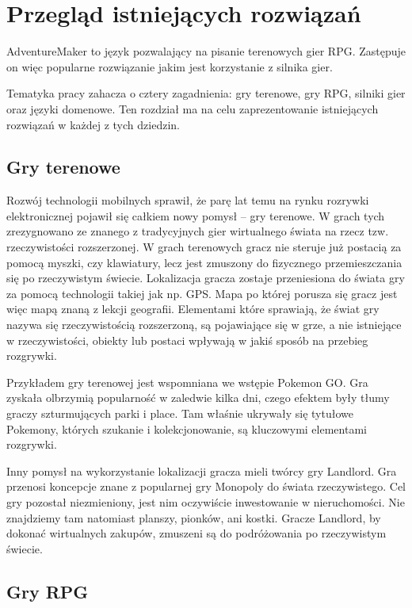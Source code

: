 \documentclass[openright]{xmgr}
\begin{document}
\chapter{Przegląd istniejących rozwiązań}

AdventureMaker to język pozwalający na pisanie terenowych gier RPG. Zastępuje on więc popularne rozwiązanie jakim jest korzystanie z silnika gier.

Tematyka pracy zahacza o cztery zagadnienia: gry terenowe, gry RPG, silniki gier oraz języki domenowe. Ten rozdział ma na celu zaprezentowanie istniejących rozwiązań w każdej z tych dziedzin.

\section{Gry terenowe}

Rozwój technologii mobilnych sprawił, że parę lat temu na rynku rozrywki elektronicznej pojawił się całkiem nowy pomysł -- gry terenowe. W grach tych zrezygnowano ze znanego z tradycyjnych gier wirtualnego świata na rzecz tzw. rzeczywistości rozszerzonej. W grach terenowych gracz nie steruje już postacią za pomocą myszki, czy klawiatury, lecz jest zmuszony do fizycznego przemieszczania się po rzeczywistym świecie. Lokalizacja gracza zostaje przeniesiona do świata gry za pomocą technologii takiej jak np. GPS. Mapa po której porusza się gracz jest więc mapą znaną z lekcji geografii. Elementami które sprawiają, że świat gry nazywa się rzeczywistością rozszerzoną, są pojawiające się w grze, a nie istniejące w rzeczywistości, obiekty lub postaci wpływają w jakiś sposób na przebieg rozgrywki.

Przykładem gry terenowej jest wspomniana we wstępie Pokemon GO. Gra zyskała olbrzymią popularność w zaledwie kilka dni, czego efektem były tłumy graczy szturmujących parki i place. Tam właśnie ukrywały się tytułowe Pokemony, których szukanie i kolekcjonowanie, są kluczowymi elementami rozgrywki.

Inny pomysł na wykorzystanie lokalizacji gracza mieli twórcy gry Landlord. Gra przenosi koncepcje znane z popularnej gry Monopoly do świata rzeczywistego. Cel gry pozostał niezmieniony, jest nim oczywiście inwestowanie w nieruchomości. Nie znajdziemy tam natomiast planszy, pionków, ani kostki. Gracze Landlord, by dokonać wirtualnych zakupów, zmuszeni są do podróżowania po rzeczywistym świecie.

\section{Gry RPG}
\end{document}
